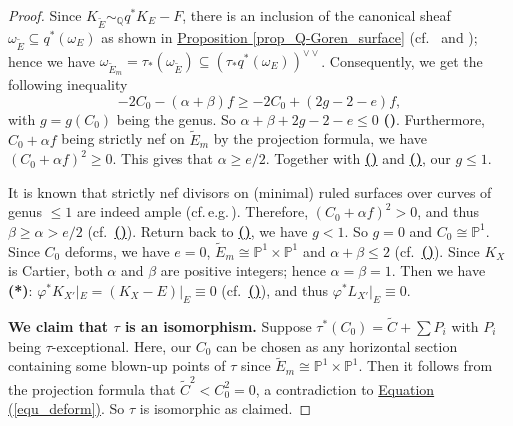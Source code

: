 \begin{proof}
Since $K_{\widetilde{E}}\sim_{\mathbb{Q}}q^*K_E-F$,
there is an inclusion of the canonical sheaf $\omega_{\widetilde{E}}\subseteq q^*(\omega_E)$ as shown in {\hyperref[prop_Q-Goren_surface]{Proposition  \ref*{prop_Q-Goren_surface}}} (cf.~ \cite[Lemma 5-1-9]{KMM87} and \cite[(4.1)]{Sak84}); hence  we have 
$\omega_{\widetilde{E}_m}=\tau_*(\omega_{\widetilde{E}})\subseteq (\tau_*q^*(\omega_E))^{\vee\vee}$. 
Consequently, we get the following inequality 
$$-2C_0-(\alpha+\beta)f\geqslant -2C_0+(2g-2-e)f,$$ 
with $g=g(C_0)$ being the genus.  
So $\alpha+\beta+2g-2-e\leqslant 0$ \hypertarget{2ag}{\textbf{(\dag\dag)}}.
Furthermore,  $C_0+\alpha f$  being  strictly nef on $\widetilde{E}_m$ by the projection formula, 
 we  have $(C_0+\alpha f)^2\geqslant 0$. 
This gives that $\alpha\geqslant e/2$.
Together with \hyperlink{1ag}{\textbf{(\dag)}} and \hyperlink{2ag}{\textbf{(\dag\dag)}}, our $g\leqslant 1$.

It is known that strictly nef divisors on (minimal) ruled surfaces over curves of genus $\leqslant 1$ are indeed ample (cf.\,e.g.\,\cite[Example 1.23 (1)]{KM98}).
Therefore, $(C_0+\alpha f)^2>0$, and thus $\beta\geqslant  \alpha>e/2$ (cf.~\hyperlink{1ag}{\textbf{(\dag)}}).
Return back to \hyperlink{2ag}{\textbf{(\dag\dag)}}, we have $g<1$.
So $g=0$ and $C_0\cong\mathbb{P}^1$.
Since $C_0$ deforms, we have $e=0$, $\widetilde{E}_m\cong\mathbb{P}^1\times\mathbb{P}^1$ and $\alpha+\beta\leqslant 2$ (cf.~\hyperlink{2ag}{\textbf{(\dag\dag)}}). 
Since  $K_X$ is Cartier, both $\alpha$ and $\beta$ are positive integers; hence $\alpha=\beta=1$.
Then we have \hypertarget{1*}{\textbf{(*)}}: $\varphi^*K_{X'}|_E=(K_X-E)|_E\equiv 0$ (cf.~\hyperlink{1ag}{\textbf{(\dag)}}), and thus $\varphi^*L_{X'}|_E\equiv 0$.

\textbf{We claim  that $\tau$ is an isomorphism.} 
Suppose  $\tau^*(C_0)=\widetilde{C}+\sum P_i$ with $P_i$ being $\tau$-exceptional.
Here, our $C_0$ can be chosen as any horizontal section containing some blown-up points of $\tau$ since $\widetilde{E}_m\cong\mathbb{P}^1\times\mathbb{P}^1$.
Then it follows from the projection formula that $\widetilde{C}^2<C_0^2=0$, a contradiction to  {\hyperref[equ_deform]{Equation  (\ref*{equ_deform})}}. 
So $\tau$ is isomorphic as claimed.



\end{proof}
